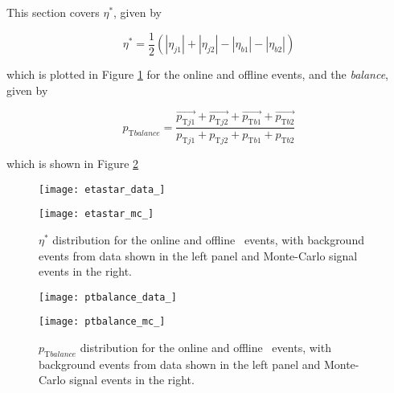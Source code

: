     This section covers $\eta^*$, given by

    \begin{equation}
    \eta^* = \frac{1}{2}(|\eta_{j1}| + |\eta_{j2}| - |\eta_{b1}| - |\eta_{b2}|)
    \end{equation}

    which is plotted in Figure \ref{f:etastar} for the online and offline events, and the \pt\textit{balance}, given by

    \begin{equation}
        p_{\text{T} balance} = \frac{\vec{p_{\text{T}j1}} + \vec{p_{\text{T}j2}} + \vec{p_{\text{T}b1}} + \vec{p_{\text{T}b2}}}{p_{\text{T}j1} + p_{\text{T}j2} + p_{\text{T}b1} + p_{\text{T}b2}}
    \end{equation}

    which is shown in Figure \ref{f:ptbalance}

    \begin{figure}[h]
        \centering
        \begin{minipage}[h]{0.48\linewidth}
            \texttt{[image: etastar\_data\_]}
        \end{minipage}
        \quad
        \begin{minipage}[h]{0.48\linewidth}
            \texttt{[image: etastar\_mc\_]}
        \end{minipage}
        \caption[Comparison of the $\eta^*$ distribution of the \VBFHBB\ events for HLT and offline objects]{$\eta^*$ distribution for the online and offline \VBFHBB\ events, with background events from data shown in the left panel and Monte-Carlo signal events in the right.}
        \label{f:etastar}
    \end{figure}

    \begin{figure}[h]
        \centering
        \begin{minipage}[h]{0.48\linewidth}
            \texttt{[image: ptbalance\_data\_]}
        \end{minipage}
        \quad
        \begin{minipage}[h]{0.48\linewidth}
            \texttt{[image: ptbalance\_mc\_]}
        \end{minipage}
        \caption[Comparison of the $p_{\text{T} balance}$ distribution of the \VBFHBB\ events for HLT and offline objects]{$p_{\text{T} balance}$ distribution for the online and offline \VBFHBB\ events, with background events from data shown in the left panel and Monte-Carlo signal events in the right.}
        \label{f:ptbalance}
    \end{figure}

